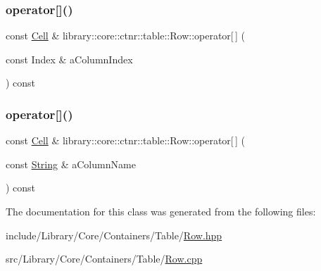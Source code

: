 \mbox{\label{classlibrary_1_1core_1_1ctnr_1_1table_1_1_row_a8fd76f9562104b7d92b91a8774609e6f}} 
\subsubsection{\texorpdfstring{operator[]()}{operator[]()}\hspace{0.1cm}{\footnotesize\ttfamily [1/2]}}
{\footnotesize\ttfamily const \hyperlink{namespacelibrary_1_1core_1_1ctnr_1_1table_aac6007d595b2967513e8e6b89f6092f5}{Cell} \& library\+::core\+::ctnr\+::table\+::\+Row\+::operator\mbox{[}$\,$\mbox{]} (\begin{DoxyParamCaption}\item[{const Index \&}]{a\+Column\+Index }\end{DoxyParamCaption}) const}

\mbox{\label{classlibrary_1_1core_1_1ctnr_1_1table_1_1_row_a6415c3a4cfde0e2c1e85fad3f972651a}} 
\subsubsection{\texorpdfstring{operator[]()}{operator[]()}\hspace{0.1cm}{\footnotesize\ttfamily [2/2]}}
{\footnotesize\ttfamily const \hyperlink{namespacelibrary_1_1core_1_1ctnr_1_1table_aac6007d595b2967513e8e6b89f6092f5}{Cell} \& library\+::core\+::ctnr\+::table\+::\+Row\+::operator\mbox{[}$\,$\mbox{]} (\begin{DoxyParamCaption}\item[{const \hyperlink{classlibrary_1_1core_1_1types_1_1_string}{String} \&}]{a\+Column\+Name }\end{DoxyParamCaption}) const}



The documentation for this class was generated from the following files\+:\begin{DoxyCompactItemize}
\item 
include/\+Library/\+Core/\+Containers/\+Table/\hyperlink{_row_8hpp}{Row.\+hpp}\item 
src/\+Library/\+Core/\+Containers/\+Table/\hyperlink{_row_8cpp}{Row.\+cpp}\end{DoxyCompactItemize}
